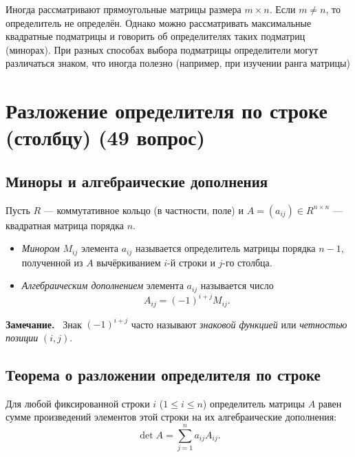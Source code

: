 \documentclass[a4paper,12pt]{article}
\newcommand{\myremark}{\textbf{Замечание.}\ }
\theoremstyle{definition}
\theoremstyle{plain}
\theoremstyle{remark}
\begin{document}
	Иногда рассматривают прямоугольные матрицы размера \( m \times n \). Если \( m \neq n \), то определитель не определён. Однако можно рассматривать максимальные квадратные подматрицы и говорить об определителях таких подматриц (минорах). При разных способах выбора подматрицы определители могут различаться знаком, что иногда полезно (например, при изучении ранга матрицы)
	
	
	
	
	
	
	\newpage
	\section{Разложение определителя по строке (столбцу) (49 вопрос)}
	
	\subsection{Миноры и алгебраические дополнения}
	
	Пусть \( R \) — коммутативное кольцо (в частности, поле) и \( A = (a_{ij}) \in R^{n \times n} \) — квадратная матрица порядка \( n \).
	
	\begin{tcolorbox}[colback=blue!5, colframe=blue!40!black, title=Определения]
		\begin{itemize}
			\item \textit{Минором} \( M_{ij} \) элемента \( a_{ij} \) называется определитель матрицы порядка \( n-1 \), полученной из \( A \) вычёркиванием \( i \)-й строки и \( j \)-го столбца.
			\item \textit{Алгебраическим дополнением} элемента \( a_{ij} \) называется число
			\[
			A_{ij} = (-1)^{i+j} M_{ij}.
			\]
		\end{itemize}
	\end{tcolorbox}
	
	\myremark
	Знак \( (-1)^{i+j} \) часто называют \textit{знаковой функцией} или \textit{четностью позиции} \( (i,j) \).
	
	\subsection{Теорема о разложении определителя по строке}
	
	\begin{tcolorbox}[colback=green!5, colframe=green!50!black, title=Теорема (Разложение по i-й строке)]
		Для любой фиксированной строки \( i \) (\( 1 \leq i \leq n \)) определитель матрицы \( A \) равен сумме произведений элементов этой строки на их алгебраические дополнения:
		\[
		\det A = \sum_{j=1}^{n} a_{ij} A_{ij}.
		\]
	\end{tcolorbox}
	
\end{document}
